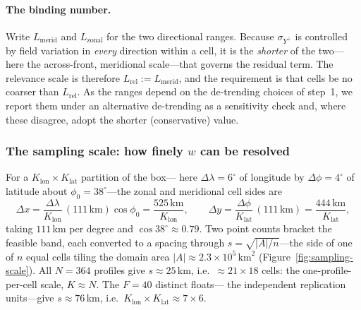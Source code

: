 \paragraph{The binding number.} Write $L_{\mathrm{merid}}$ and
$L_{\mathrm{zonal}}$ for the two directional ranges. Because
$\sigma_{Y^{\perp}}$ is controlled by field variation in \emph{every}
direction within a cell, it is the \emph{shorter} of the two---here the
across-front, meridional scale---that governs the residual term. The
relevance scale is therefore $L_{\mathrm{rel}}:=L_{\mathrm{merid}}$, and
the requirement is that cells be no coarser than $L_{\mathrm{rel}}$. As
the ranges depend on the de-trending choices of step~1, we report them
under an alternative de-trending as a sensitivity check and, where these
disagree, adopt the shorter (conservative) value.

\subsubsection*{The sampling scale: how finely $w$ can be resolved}

For a $K_{\mathrm{lon}}\times K_{\mathrm{lat}}$ partition of the box---%
here $\Delta\lambda=6^\circ$ of longitude by $\Delta\phi=4^\circ$ of
latitude about $\phi_0=38^\circ$---the zonal and meridional cell sides
are
\begin{equation}
  \Delta x=\frac{\Delta\lambda}{K_{\mathrm{lon}}}\,(111\,\mathrm{km})\cos\phi_0
    =\frac{525\,\mathrm{km}}{K_{\mathrm{lon}}},
  \qquad
  \Delta y=\frac{\Delta\phi}{K_{\mathrm{lat}}}\,(111\,\mathrm{km})
    =\frac{444\,\mathrm{km}}{K_{\mathrm{lat}}},
  \label{eq:cell-km}
\end{equation}
taking $111$\,km per degree and $\cos38^\circ\approx0.79$. Two point
counts bracket the feasible band, each converted to a spacing through
$s=\sqrt{|A|/n}$---the side of one of $n$ equal cells tiling the domain
area $|A|\approx2.3\times10^{5}\,\mathrm{km}^2$
(Figure~\ref{fig:sampling-scale}). All $N=364$ profiles give
$s\approx25$\,km, i.e.\ ${\approx}21\times18$ cells: the
one-profile-per-cell scale, $K\approx N$. The $F=40$ distinct floats---%
the independent replication units---give $s\approx76$\,km, i.e.\
$K_{\mathrm{lon}}\times K_{\mathrm{lat}}\approx7\times6$.

